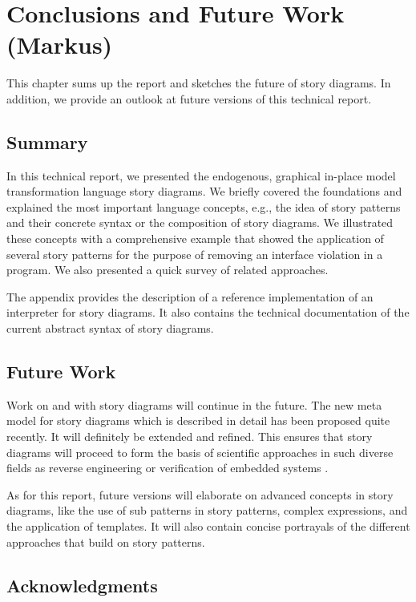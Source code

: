 \chapter{Conclusions and Future Work (Markus)}

This chapter sums up the report and sketches the future of story diagrams. In addition, we provide an outlook at future versions of this technical report.

\section{Summary}

In this technical report, we presented the endogenous, graphical in-place model transformation language story diagrams. We briefly covered the foundations and explained the most important language concepts, e.g., the idea of story patterns and their concrete syntax or the composition of story diagrams. We illustrated these concepts with a comprehensive example that showed the application of several story patterns for the purpose of removing an interface violation in a program. We also presented a quick survey of related approaches.

The appendix provides the description of a reference implementation of an interpreter for story diagrams. It also contains the technical documentation of the current abstract syntax of story diagrams.

\section{Future Work}

Work on and with story diagrams will continue in the future. The new meta model for story diagrams which is described in detail has been proposed quite recently\cite{HRvD+11}. It will definitely be extended and refined. This ensures that story diagrams will proceed to form the basis of scientific approaches in such diverse fields as reverse engineering \cite{DMT10} or verification of embedded systems \cite{HSE10}.

As for this report, future versions will elaborate on advanced concepts in story diagrams, like the use of sub patterns in story patterns, complex expressions, and the application of templates. It will also contain concise portrayals of the different approaches that build on story patterns.

\section*{Acknowledgments}

